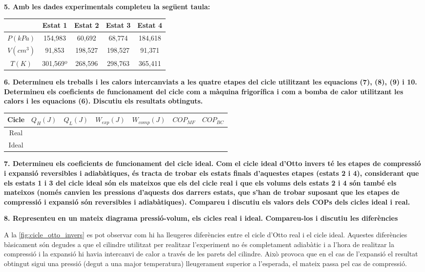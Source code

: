 \documentclass[a4paper]{article}
\begin{document}
\textbf{5. Amb les dades experimentals completeu la següent taula:}

\begin{tabular}{c|cccc}
    & Estat 1 & Estat 2 & Estat 3 & Estat 4 \\
    \hline
    $P(kPa)$ & 154,983 & 60,692 & 68,774 & 184,618 \\
    $V(cm^3)$ & 91,853 & 198,527 & 198,527 & 91,371 \\
    $T(K)$ & 301,569º & 268,596 & 298,763 & 365,411 \\
\end{tabular}

\textbf{6. Determineu els treballs i les calors intercanviats a les quatre etapes del cicle utilitzant les equacions (7), (8), (9) i 10. Determineu els coeficients de funcionament del cicle com a màquina frigorífica i com a bomba de calor utilitzant les calors i les equacions (6). Discutiu els resultats obtinguts.}

\begin{tabular}{c|cccccc}
    Cicle & $Q_H(J)$ & $Q_L(J)$ & $W_{exp}(J)$ & $W_{comp}(J)$ & $COP_{MF}$ & $COP_{BC}$ \\
    \hline
    Real & & & & & & \\
    Ideal & & & & & &
\end{tabular}

\textbf{7. Determineu els coeficients de funcionament del cicle ideal. Com el cicle ideal d’Otto invers té les etapes de compressió i expansió reversibles i adiabàtiques, és tracta de trobar els estats finals d’aquestes etapes (estats 2 i 4), considerant que els estats 1 i 3 del cicle ideal són els mateixos que els del cicle real i que els volums dels estats 2 i 4 són també els mateixos (només canvien les pressions d’aquests dos darrers estats, que s’han de trobar suposant que les etapes de compressió i expansió són reversibles i adiabàtiques). Compareu i discutiu els valors dels COPs dels cicles ideal i real.}

\textbf{8. Representeu en un mateix diagrama pressió-volum, els cicles real i ideal. Compareu-los i discutiu les diferències}

A la \autoref{fig:cicle_otto_invers} es pot observar com hi ha lleugeres diferències entre el cicle d'Otto real i el cicle ideal. Aquestes diferències bàsicament són degudes a que el cilindre utilitzat per realitzar l'experiment no és completament adiabàtic i a l'hora de realitzar la compressió i la expansió hi havia intercanvi de calor a través de les parets del cilindre. Això provoca que en el cas de l'expansió el resultat obtingut sigui una pressió (degut a una major temperatura) lleugerament superior a l'esperada, el mateix passa pel cas de compressió.
\end{document}
